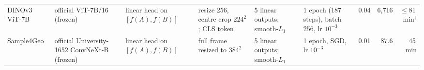 \begin{table}[t]
{\begin{tabular}{@{}l L{2.3cm} L{2.75cm} L{2.75cm} L{3.3cm} L{2.2cm} r r r@{}}
DINOv3 ViT-7B & official ViT-7B/16 (frozen) & linear head on $[f(A),f(B)]$ & resize 256, centre crop $224^2$; CLS token & 5 linear outputs; smooth-$L_1$ & 1 epoch (187 steps), batch 256, lr $10^{-3}$ & 0.04 & 6{,}716 & $\le$81\,min$^\dagger$ \\
Sample4Geo & official University-1652 ConvNeXt-B (frozen) & linear head on $[f(A),f(B)]$ & full frame resized to $384^2$ & 5 linear outputs; smooth-$L_1$ & 1 epoch, SGD, lr $10^{-3}$ & 0.01 & 87.6 & 45\,min \\
\bottomrule
\end{tabular}}
\end{table}

